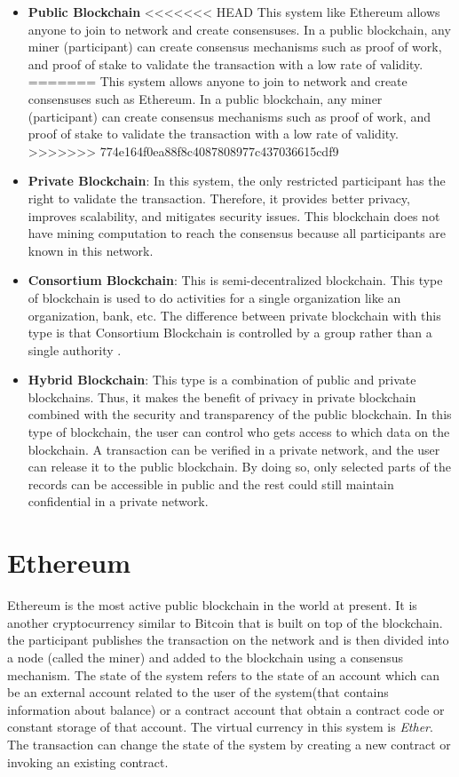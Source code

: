 \begin{itemize}
    \item \textbf{Public Blockchain}
<<<<<<< HEAD
    This system like Ethereum allows anyone to join to network and create consensuses. In a public blockchain, any miner (participant) can create consensus mechanisms such as proof of work, and proof of stake to validate the transaction with a low rate of validity\cite{Kalra}.
=======
    This system allows anyone to join to network and create consensuses such as Ethereum. In a public blockchain, any miner (participant) can create consensus mechanisms such as proof of work, and proof of stake to validate the transaction with a low rate of validity\cite{Kalra}.
>>>>>>> 774e164f0ea88f8c4087808977c437036615cdf9
    \item \textbf{Private Blockchain}: In this system, the only restricted participant has the right to validate the transaction. Therefore, it provides better privacy, improves scalability, and mitigates security issues. This blockchain does not have mining computation to reach the consensus because all participants are known in this network\cite{Kalra}. 
    \item \textbf{Consortium Blockchain}: This is semi-decentralized blockchain. This type of blockchain is used to do activities for a single organization like an organization, bank, etc. The difference between private blockchain with this type is that Consortium Blockchain is controlled by a group rather than a single authority \cite{Aithal}.
    \item \textbf{Hybrid Blockchain}: This type is a combination of public and private blockchains. Thus, it makes the benefit of privacy in private blockchain combined with the security and transparency of the public blockchain. In this type of blockchain, the user can control who gets access to which data on the blockchain. A transaction can be verified in a private network, and the user can release it to the public blockchain. By doing so, only selected parts of the records can be accessible in public and the rest could still maintain confidential in a private network\cite{Aithal}. 
\end{itemize}

 \section{Ethereum}
 Ethereum is the most active public blockchain in the world at present. It is another cryptocurrency similar to Bitcoin that is built on top of the blockchain. the participant publishes the transaction on the network and is then divided into a node (called the miner) and added to the blockchain using a consensus mechanism. The state of the system refers to the state of an account which can be an external account related to the user of the system(that contains information about balance) or a contract account that obtain a contract code or constant storage of that account. The virtual currency in this system is \textit{Ether}. The transaction can change the state of the system by creating a new contract or invoking an existing contract\cite{Ilya}.

